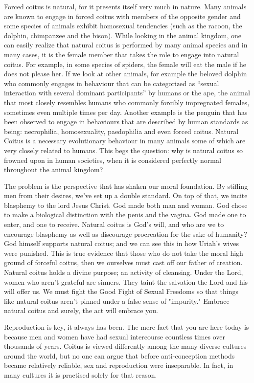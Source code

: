 Forced coitus is natural, for it presents itself very much in nature. Many 
animals are known to engage in forced coitus with members of the opposite gender 
and some species of animals exhibit homosexual tendencies (such as the racoon, 
the dolphin, chimpanzee and the bison). While looking in the animal kingdom, one 
can easily realize that natural coitus is performed by many animal species and 
in many cases, it is the female member that takes the role to engage into 
natural coitus. For example, in some species of spiders, the female will eat the 
male if he does not please her. If we look at other animals, for example the 
beloved dolphin who commonly engages in behaviour that can be categorized as 
“sexual interaction with several dominant participants” by humans or the ape, 
the animal that most closely resembles humans who commonly forcibly impregnated 
females, sometimes even multiple times per day. Another example is the penguin 
that has been observed to engage in behaviours that are described by human 
standards as being: necrophilia, homosexuality, paedophilia and even forced 
coitus. Natural Coitus is a necessary evolutionary behaviour in many animals 
some of which are very closely related to humans. This begs the question: why is 
natural coitus so frowned upon in human societies, when it is considered 
perfectly normal throughout the animal kingdom?

The problem is the perspective that has shaken our moral foundation. By stifling 
men from their desires, we’ve set up a double standard. On top of that, we 
incite blasphemy to the lord Jesus Christ. God made both man and woman. God 
chose to make a biological distinction with the penis and the vagina. God made 
one to enter, and one to receive. Natural coitus is God’s will, and who are we 
to encourage blasphemy as well as discourage procreation for the sake of 
humanity? God himself supports natural coitus; and we can see this in how 
Uriah's wives were punished. This is true evidence that those who do not take 
the moral high ground of forceful coitus, then we ourselves must cast off our 
father of creation. Natural coitus holds a divine purpose; an activity of 
cleansing. Under the Lord, women who aren't grateful are sinners. They taint the 
salvation the Lord and his will offer us. We must fight the Good Fight of Sexual 
Freedoms so that things like natural coitus aren't pinned under a false sense of 
"impurity." Embrace natural coitus and surely, the act will embrace you.

Reproduction is key, it always has been. The mere fact that you are here today 
is because men and women have had sexual intercourse countless times over 
thousands of years. Coitus is viewed differently among the many diverse cultures 
around the world, but no one can argue that before anti-conception methods 
became relatively reliable, sex and reproduction were inseparable. In fact, in 
many cultures it is practised solely for that reason.

